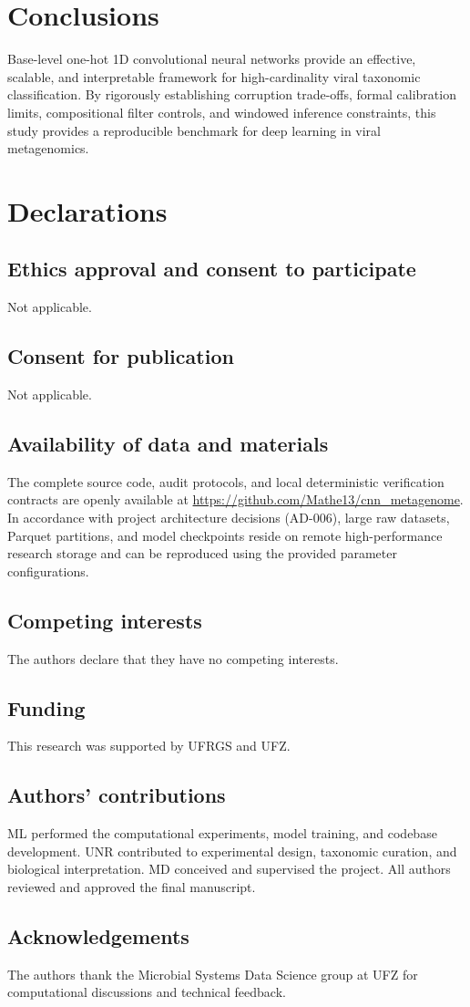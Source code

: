 \documentclass[11pt,a4paper]{article}
\begin{document}
\section{Conclusions}
Base-level one-hot 1D convolutional neural networks provide an effective, scalable, and interpretable framework for high-cardinality viral taxonomic classification. By rigorously establishing corruption trade-offs, formal calibration limits, compositional filter controls, and windowed inference constraints, this study provides a reproducible benchmark for deep learning in viral metagenomics.

\section*{Declarations}

\subsection*{Ethics approval and consent to participate}
Not applicable.

\subsection*{Consent for publication}
Not applicable.

\subsection*{Availability of data and materials}
The complete source code, audit protocols, and local deterministic verification contracts are openly available at \url{https://github.com/Mathe13/cnn_metagenome}. In accordance with project architecture decisions (AD-006), large raw datasets, Parquet partitions, and model checkpoints reside on remote high-performance research storage and can be reproduced using the provided parameter configurations.

\subsection*{Competing interests}
The authors declare that they have no competing interests.

\subsection*{Funding}
This research was supported by UFRGS and UFZ.

\subsection*{Authors' contributions}
ML performed the computational experiments, model training, and codebase development. UNR contributed to experimental design, taxonomic curation, and biological interpretation. MD conceived and supervised the project. All authors reviewed and approved the final manuscript.

\subsection*{Acknowledgements}
The authors thank the Microbial Systems Data Science group at UFZ for computational discussions and technical feedback.



\end{document}
